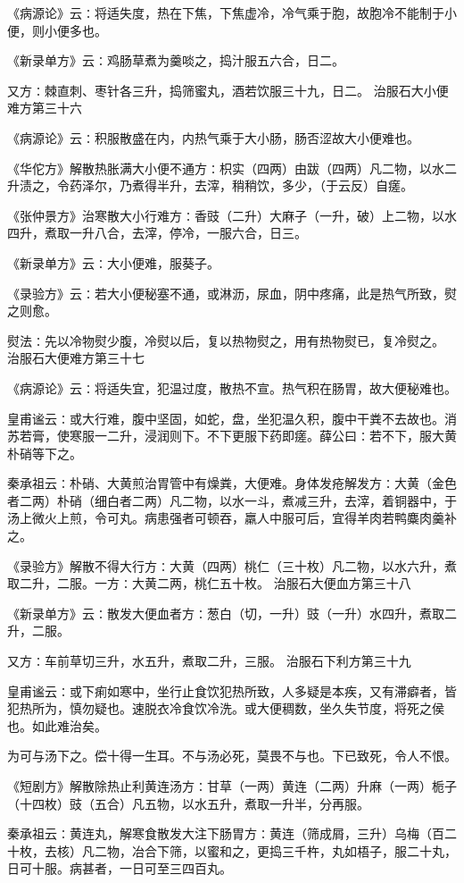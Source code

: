 \documentclass[a4paper,12pt,UTF8,twoside]{ctexbook}
\begin{document}
《病源论》云∶将适失度，热在下焦，下焦虚冷，冷气乘于胞，故胞冷不能制于小便，则小便多也。

《新录单方》云∶鸡肠草煮为羹啖之，捣汁服五六合，日二。

又方∶棘直刺、枣针各三升，捣筛蜜丸，酒若饮服三十九，日二。
治服石大小便难方第三十六

《病源论》云∶积服散盛在内，内热气乘于大小肠，肠否涩故大小便难也。

《华佗方》解散热胀满大小便不通方∶枳实（四两）由跋（四两）凡二物，以水二升渍之，令药泽尔，乃煮得半升，去滓，稍稍饮，多少，（于云反）自瘥。

《张仲景方》治寒散大小行难方∶香豉（二升）大麻子（一升，破）上二物，以水四升，煮取一升八合，去滓，停冷，一服六合，日三。

《新录单方》云∶大小便难，服葵子。

《录验方》云∶若大小便秘塞不通，或淋沥，尿血，阴中疼痛，此是热气所致，熨之则愈。

熨法∶先以冷物熨少腹，冷熨以后，复以热物熨之，用有热物熨已，复冷熨之。
治服石大便难方第三十七

《病源论》云∶将适失宜，犯温过度，散热不宣。热气积在肠胃，故大便秘难也。

皇甫谧云∶或大行难，腹中坚固，如蛇，盘，坐犯温久积，腹中干粪不去故也。消苏若膏，使寒服一二升，浸润则下。不下更服下药即瘥。薛公曰∶若不下，服大黄朴硝等下之。

秦承祖云∶朴硝、大黄煎治胃管中有燥粪，大便难。身体发疮解发方∶大黄（金色者二两）朴硝（细白者二两）凡二物，以水一斗，煮减三升，去滓，着铜器中，于汤上微火上煎，令可丸。病患强者可顿吞，羸人中服可后，宜得羊肉若鸭麋肉羹补之。

《录验方》解散不得大行方∶大黄（四两）桃仁（三十枚）凡二物，以水六升，煮取二升，二服。一方∶大黄二两，桃仁五十枚。
治服石大便血方第三十八

《新录单方》云∶散发大便血者方∶葱白（切，一升）豉（一升）水四升，煮取二升，二服。

又方∶车前草切三升，水五升，煮取二升，三服。
治服石下利方第三十九

皇甫谧云∶或下痢如寒中，坐行止食饮犯热所致，人多疑是本疾，又有滞癖者，皆犯热所为，慎勿疑也。速脱衣冷食饮冷洗。或大便稠数，坐久失节度，将死之侯也。如此难治矣。

为可与汤下之。偿十得一生耳。不与汤必死，莫畏不与也。下已致死，令人不恨。

《短剧方》解散除热止利黄连汤方∶甘草（一两）黄连（二两）升麻（一两）栀子（十四枚）豉（五合）凡五物，以水五升，煮取一升半，分再服。

秦承祖云∶黄连丸，解寒食散发大注下肠胃方∶黄连（筛成屑，三升）乌梅（百二十枚，去核）凡二物，冶合下筛，以蜜和之，更捣三千杵，丸如梧子，服二十丸，日可十服。病甚者，一日可至三四百丸。
\end{document}
